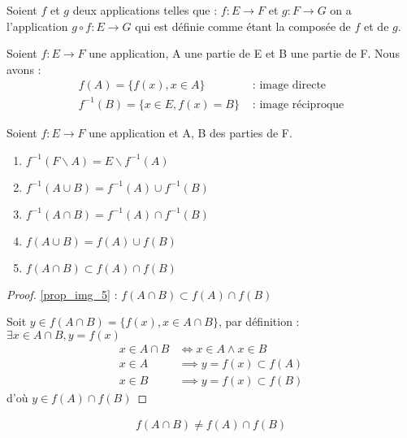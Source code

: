 \begin{definition}[Composition]
	Soient $f$ et $g$ deux applications telles que :
	$f:E \to F$ et $g:F \to G$ on a l'application $g \circ f : E \to G$ qui est définie comme étant la composée de $f$ et de $g$.
\end{definition}

\begin{definition}
	Soient $f:E \to F$ une application, A une partie de E et B une partie de F. Nous avons :
	\begin{align*}
		f(A) = \{f(x), x \in A\} &\text{ : image directe} \\
		f^{-1}(B) = \{x \in E, f(x) = B\} &\text{ : image réciproque}
	\end{align*}
\end{definition}
\clearpage
\begin{proposition}
	Soient $f:E \to F$ une application et A, B des parties de F.
	\begin{enumerate}
		\item \label{prop_img_1} $f^{-1}(F \backslash A) = E \backslash f^{-1}(A)$
		\item \label{prop_img_2} $f^{-1}(A \cup B) = f^{-1}(A) \cup f^{-1}(B)$
		\item \label{prop_img_3} $f^{-1}(A \cap B) = f^{-1}(A) \cap f^{-1}(B)$
		\item \label{prop_img_4} $f(A \cup B) = f(A) \cup f(B)$
		\item \label{prop_img_5} $f(A \cap B) \subset f(A) \cap f(B)$
	\end{enumerate}
\end{proposition}

\begin{proof}
	\ref{prop_img_5} : $f(A \cap B) \subset f(A) \cap f(B)$ \\
	\par \noindent Soit $y \in f(A \cap B) = \{f(x), x \in A \cap B\}$, par définition : $\exists x \in A \cap B, y = f(x)$
	\begin{align*}
		x \in A \cap B &\iff x \in A \wedge x \in B \\
		x \in A &\implies y = f(x) \subset f(A) \\
		x \in B &\implies y = f(x) \subset f(B) 
	\end{align*}
	d'où $y \in f(A) \cap f(B)$
\end{proof} 

\begin{remarque}
	\begin{align*}
		f(A \cap B) \neq f(A) \cap f(B)
	\end{align*}
\end{remarque}